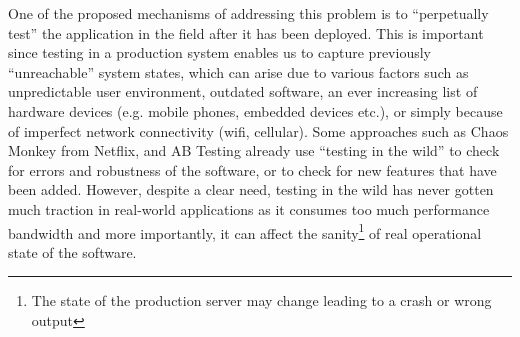 One of the proposed mechanisms of addressing this problem is to ``perpetually test''\cite{perpetual} the application in the field after it has been deployed. 
This is important since testing in a production system enables us to capture previously ``unreachable'' system states, which can arise due to various factors such as unpredictable user environment, outdated software, an ever increasing list of hardware devices (e.g. mobile phones, embedded devices etc.), or simply because of imperfect network connectivity (wifi, cellular).
Some approaches such as Chaos Monkey\cite{chaosmonkey} from Netflix, and AB Testing\cite{abtesting} already use ``testing in the wild'' to check for errors and robustness of the software, or to check for new features that have been added.  
However, despite a clear need, testing in the wild has never gotten much traction in real-world applications as it consumes too much performance bandwidth and more importantly, it can affect the sanity\footnote{The state of the production server may change leading to a crash or wrong output} of real operational state of the software.




